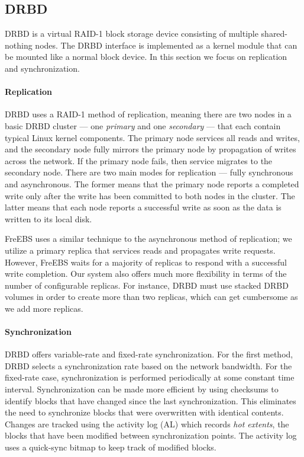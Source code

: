 \subsection{DRBD}
\label{sec:drbd}
DRBD\textsuperscript{\textregistered} is a virtual RAID-1 block storage 
device consisting of multiple shared-nothing nodes. The 
DRBD\textsuperscript{\textregistered} interface is implemented as a kernel 
module that can be mounted like a normal block 
device. In this section we focus on replication and synchronization.

\paragraph{Replication}
DRBD\textsuperscript{\textregistered} uses a RAID-1 method of replication, 
meaning there are two nodes in a basic DRBD\textsuperscript{\textregistered} 
cluster --- one \emph{primary} and one \emph{secondary} --- that each
contain typical Linux kernel components\cite{drbd, drbd_manual}. The 
primary node 
services all reads and writes, and the secondary node fully mirrors the 
primary node by propagation of writes across the network. If the primary 
node fails, then service migrates to the secondary node. There are two 
main modes for replication --- fully synchronous and asynchronous. 
The former means that the primary node reports a completed write only after 
the write has been committed to both nodes in the cluster. The latter means 
that each node reports a successful write as soon as the data is written to 
its local disk. 

FreEBS uses a similar technique to the asynchronous method of replication;
we utilize a primary replica that services reads and propagates write 
requests. However, FreEBS waits for a majority of replicas to respond with a
successful write completion. Our system also offers much more flexibility in 
terms of the number of configurable replicas. For instance, 
DRBD\textsuperscript{\textregistered} must use 
stacked DRBD volumes in order to create more than two replicas, which can 
get cumbersome as we add more replicas.

\paragraph{Synchronization} 
DRBD\textsuperscript{\textregistered} offers 
variable-rate and fixed-rate synchronization\cite{drbd_manual}.
For the first method, DRBD\textsuperscript{\textregistered} selects a 
synchronization rate
based on the network bandwidth. For the fixed-rate case, synchronization is
performed periodically at some constant time interval. Synchronization 
can be made more efficient by using checksums to identify blocks that have 
changed since the last synchronization. This eliminates the need to 
synchronize blocks that were overwritten with identical contents. Changes
are tracked using the activity log (AL) which records \emph{hot extents}, 
the blocks that have been modified between synchronization points. The 
activity log uses a quick-sync bitmap to keep track of modified blocks.

